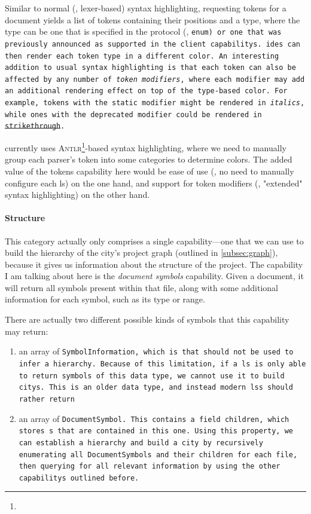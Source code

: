 \documentclass[../thesis]{subfiles}
\begin{document}
\begin{itemize}
	      Similar to normal (\eg, lexer-based) syntax highlighting, requesting \glspl{token} for a document yields a list of tokens containing their positions and a type, where the type can be one that is specified in the protocol (\eg, \tt{enum}) or one that was previously announced as supported in the client \glspl{capability}.
	      \glspl{ide} can then render each token type in a different color.
	      An interesting addition to usual syntax highlighting is that each token can also be affected by any number of \emph{token modifiers}, where each modifier may add an additional rendering effect on top of the type-based color.
	      For example, tokens with the \tt{static} modifier might be rendered in \textit{italics}, while ones with the \tt{deprecated} modifier could be rendered in \st{strikethrough}.

	      \SEE{} currently uses \textsc{Antlr}\footnote{}-based syntax highlighting, where we need to manually group each parser's token into some categories to determine colors.
	      The added value of the \glspl{token} \gls{capability} here would be ease of use (\ie, no need to manually configure each \gls{ls}) on the one hand, and support for token modifiers (\ie, "extended" syntax highlighting) on the other hand.
\end{itemize}


\paragraph{Structure}
This category actually only comprises a single \gls{capability}---one that we can use to build the hierarchy of the \gls{city}'s project graph (outlined in \cref{subsec:graph}), because it gives us information about the structure of the project.
The \gls{capability} I am talking about here is the \emph{document symbols} \gls{capability}.
Given a document, it will return all symbols present within that file, along with some additional information for each symbol, such as its type or \gls{range}.

There are actually two different possible kinds of symbols that this \gls{capability} may return:
\begin{enumerate}
	\item an array of \tt{SymbolInformation}, which is  that should not be used to infer a hierarchy.
	      Because of this limitation, if a \gls{ls} is only able to return symbols of this data type, we cannot use it to build \glspl{city}.
	      This is an older data type, and instead modern \glspl{ls} should rather return
	\item an array of \tt{DocumentSymbol}.
	      This contains a field \tt{children}, which stores s that are contained in this one.
	      Using this property, we can establish a hierarchy and build a \gls{city} by recursively enumerating all \tt{DocumentSymbol}s and their children for each file, then querying for all relevant information by using the other \glspl{capability} outlined before.
\end{enumerate}
\end{document}
